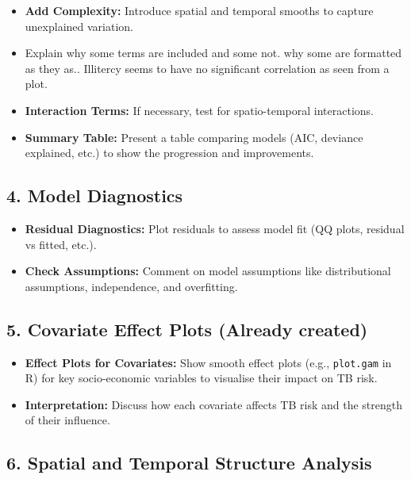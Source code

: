\documentclass[
  11pt,
  a4paper,11pt]{article}
\begin{document}
\begin{itemize}
\item
  \textbf{Add Complexity:} Introduce spatial and temporal smooths to
  capture unexplained variation.
\item
  Explain why some terms are included and some not. why some are
  formatted as they as.. Illitercy seems to have no significant
  correlation as seen from a plot.
\item
  \textbf{Interaction Terms:} If necessary, test for spatio-temporal
  interactions.
\item
  \textbf{Summary Table:} Present a table comparing models (AIC,
  deviance explained, etc.) to show the progression and improvements.
\end{itemize}

\subsection{\texorpdfstring{\textbf{4. Model
Diagnostics}}{4. Model Diagnostics}}\label{model-diagnostics}

\begin{itemize}
\item
  \textbf{Residual Diagnostics:} Plot residuals to assess model fit (QQ
  plots, residual vs fitted, etc.).
\item
  \textbf{Check Assumptions:} Comment on model assumptions like
  distributional assumptions, independence, and overfitting.
\end{itemize}

\subsection{\texorpdfstring{\textbf{5. Covariate Effect Plots} (Already
created)}{5. Covariate Effect Plots (Already created)}}\label{covariate-effect-plots-already-created}

\begin{itemize}
\item
  \textbf{Effect Plots for Covariates:} Show smooth effect plots (e.g.,
  \texttt{plot.gam} in R) for key socio-economic variables to visualise
  their impact on TB risk.
\item
  \textbf{Interpretation:} Discuss how each covariate affects TB risk
  and the strength of their influence.
\end{itemize}

\subsection{\texorpdfstring{\textbf{6. Spatial and Temporal Structure
Analysis}}{6. Spatial and Temporal Structure Analysis}}\label{spatial-and-temporal-structure-analysis}
\end{document}
